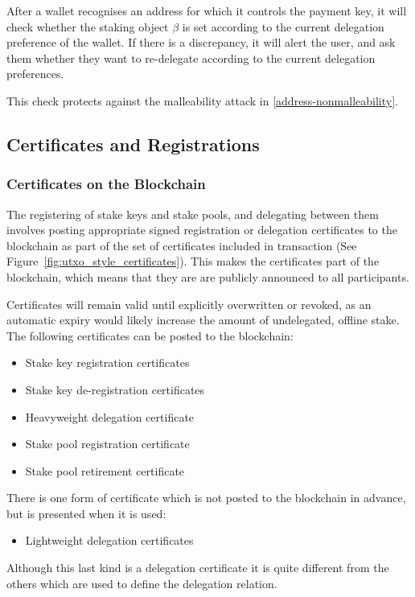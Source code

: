 \documentclass[11pt,a4paper]{article}
\begin{document}
After a wallet recognises an address for which it controls the payment
key, it will check whether the staking object \(\beta\) is set according
to the current delegation preference of the wallet. If there is a
discrepancy, it will alert the user, and ask them whether they want to
re-delegate according to the current delegation preferences.

This check protects against the malleability attack in
\cref{address-nonmalleability}.

\subsection{Certificates and Registrations}
\label{certificates-and-registrations}

\subsubsection{Certificates on the Blockchain}
\label{certificates-on-the-blockchain}

The registering of stake keys and stake pools, and delegating between them
involves posting appropriate signed registration or delegation certificates to
the blockchain as part of the set of certificates included in transaction (See
Figure~\ref{fig:utxo_style_certificates}). This makes the certificates part of
the blockchain, which means that they are are publicly announced to all
participants.

Certificates will remain valid
until explicitly overwritten or revoked, as an automatic expiry would
likely increase the amount of undelegated, offline stake. The following
certificates can be posted to the blockchain:
\begin{itemize}
\item Stake key registration certificates
\item Stake key de-registration certificates
\item Heavyweight delegation certificate
\item Stake pool registration certificate
\item Stake pool retirement certificate
\end{itemize}
There is one form of certificate which is not posted to the blockchain
in advance, but is presented when it is used:
\begin{itemize}
\item
  Lightweight delegation certificates
\end{itemize}
Although this last kind is a delegation certificate it is quite
different from the others which are used to define the delegation
relation.
\end{document}
